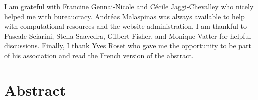 \documentclass[12pt]{report}
\renewcommand{\(}{\left(}
\renewcommand{\)}{\right)}
\renewcommand{\[}{\left[}
\renewcommand{\]}{\right]}
\begin{document}
I am grateful with Francine Gennai-Nicole and C\'{e}cile Jaggi-Chevalley who nicely helped me with bureaucracy. Andr\'{e}as Malaspinas was always available to help with computational resources and the website administration. I am thankful to Pascale Sciarini, Stella Saavedra, Gilbert Fisher, and  Monique Vatter for helpful discussions. Finally, I thank Yves Roset who gave me the opportunity to be part of his association and read the French version of the abstract. 
  
\newpage  

\chapter*{Abstract}  

\vspace{3mm}
\end{document}
